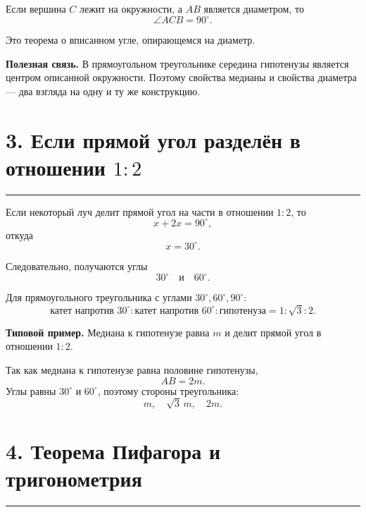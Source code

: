 \documentclass[a4paper,12pt]{article}
\newcommand{\key}[1]{\textcolor{darkaccent}{\textbf{#1}}}
\newcommand{\sectionrule}{%
  \par\vspace{-0.35em}%
  {\color{accent!60}\rule{\linewidth}{0.7pt}}%
  \vspace{0.35em}
}
\begin{document}
Если вершина \(C\) лежит на окружности, а \(AB\) является диаметром, то
\[
\boxed{\angle ACB=90^\circ}.
\]

Это теорема о вписанном угле, опирающемся на диаметр.

\begin{center}
\end{center}

\key{Полезная связь.}
В прямоугольном треугольнике середина гипотенузы является центром
описанной окружности. Поэтому свойства медианы и свойства диаметра ---
два взгляда на одну и ту же конструкцию.

\section*{\textcolor{darkaccent}{3. Если прямой угол разделён в отношении \(1:2\)}}
\sectionrule

Если некоторый луч делит прямой угол на части в отношении \(1:2\), то
\[
x+2x=90^\circ,
\]
откуда
\[
x=30^\circ.
\]

Следовательно, получаются углы
\[
30^\circ\quad\text{и}\quad60^\circ.
\]

Для прямоугольного треугольника с углами
\(30^\circ,60^\circ,90^\circ\):
\[
\boxed{
\text{катет напротив }30^\circ
:
\text{катет напротив }60^\circ
:
\text{гипотенуза}
=
1:\sqrt3:2
}.
\]

\textbf{Типовой пример.}
Медиана к гипотенузе равна \(m\) и делит прямой угол в отношении \(1:2\).

Так как медиана к гипотенузе равна половине гипотенузы,
\[
AB=2m.
\]
Углы равны \(30^\circ\) и \(60^\circ\), поэтому стороны треугольника:
\[
\boxed{m,\quad \sqrt3\,m,\quad 2m}.
\]

\section*{\textcolor{darkaccent}{4. Теорема Пифагора и тригонометрия}}
\sectionrule
\end{document}
